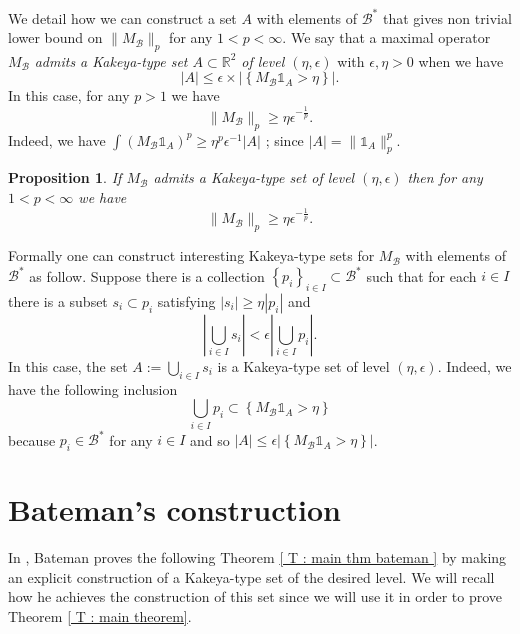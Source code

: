 \documentclass{article}
\newtheorem{prp}{Proposition}
\begin{document}
We detail how we can construct a set $A$ with elements of $\mathcal{B}^*$ that gives non trivial lower bound on $\|M_\mathcal{B} \|_p$ for any $1 < p < \infty$. We say that a maximal operator $M_\mathcal{B}$ \textit{admits a Kakeya-type set $A \subset \mathbb{R}^2$ of level $(\eta,\epsilon)$} with $\epsilon,\eta > 0$ when we have $$|A| \leq \epsilon \times \left|\left\{ M_\mathcal{B}\mathbb{1}_A > \eta \right\}\right|.$$ In this case, for any $p > 1$ we have $$\|M_\mathcal{B}\|_p  \geq  \eta{\epsilon^{-\frac{1}{p}} }.$$ Indeed, we have $\int (M_\mathcal{B}\mathbb{1}_{A})^p \geq \eta^p \epsilon^{-1}|A|$ ; since $|A| = \|\mathbb{1}_A\|_p^p$.

\begin{prp}
If $M_\mathcal{B}$ admits a Kakeya-type set of level $\left(\eta,\epsilon\right)$ then for any $1 < p < \infty$ we have $$\|M_\mathcal{B}\|_p  \geq  \eta{\epsilon^{-\frac{1}{p}} }.$$
\end{prp}





Formally one can construct interesting Kakeya-type sets for $M_\mathcal{B}$ with elements of $\mathcal{B}^*$ as follow. Suppose there is a collection $ \left\{ p_i \right\}_{i \in I} \subset \mathcal{B}^*$  such that for each $i \in I$ there is a subset $s_i \subset p_i$ satisfying $|s_i| \geq \eta|p_i|$ and $$\left|\bigcup_{i \in I} s_i\right| < \epsilon \left|\bigcup_{i \in I } p_i\right|.$$ In this case, the set $A := \bigcup_{i \in I} s_i$ is a Kakeya-type set of level $(\eta,\epsilon)$. Indeed, we have the following inclusion $$ \bigcup_{i \in I} p_i \subset \left\{ M_\mathcal{B}\mathbb{1}_{ A} > \eta \right\}$$ because $p_i \in \mathcal{B}^*$ for any $i \in I$ and so $|A| \leq \epsilon \left|\left\{ M_\mathcal{B}\mathbb{1}_{ A } > \eta \right\}\right|$.






\section{Bateman's construction}\label{ S : An Estimate of Bateman }



In \cite{BATEMAN}, Bateman proves the following Theorem \ref{ T : main thm bateman } by making an explicit construction of a Kakeya-type set of the desired level. We will recall how he achieves the construction of this set since we will use it in order to prove Theorem \ref{ T : main theorem}.
\end{document}

